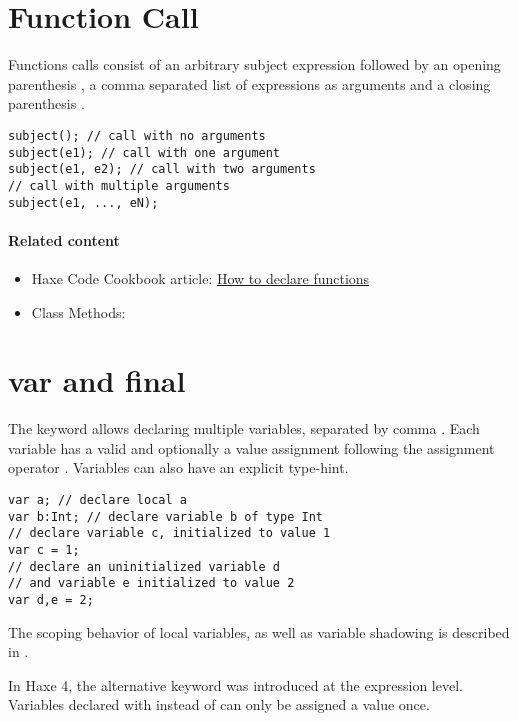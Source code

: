 \section{Function Call}
\label{expression-function-call}

Functions calls consist of an arbitrary subject expression followed by an opening parenthesis \expr{(}, a comma \expr{,} separated list of expressions as arguments and a closing parenthesis \expr{)}.

\begin{lstlisting}
subject(); // call with no arguments
subject(e1); // call with one argument
subject(e1, e2); // call with two arguments
// call with multiple arguments
subject(e1, ..., eN);
\end{lstlisting}


\paragraph{Related content}
\begin{itemize}
	\item Haxe Code Cookbook article: \href{http://code.haxe.org/category/beginner/declare-functions.html}{How to declare functions}
	\item Class Methods: 
\end{itemize}


\section{var and final}
\label{expression-var}

The  keyword allows declaring multiple variables, separated by comma \expr{,}. Each variable has a valid  and optionally a value assignment following the assignment operator \expr{=}. Variables can also have an explicit type-hint.

\begin{lstlisting}
var a; // declare local a
var b:Int; // declare variable b of type Int
// declare variable c, initialized to value 1
var c = 1;
// declare an uninitialized variable d
// and variable e initialized to value 2
var d,e = 2;
\end{lstlisting}

The scoping behavior of local variables, as well as variable shadowing is described in .


In Haxe 4, the alternative keyword  was introduced at the expression level. Variables declared with  instead of  can only be assigned a value once.

